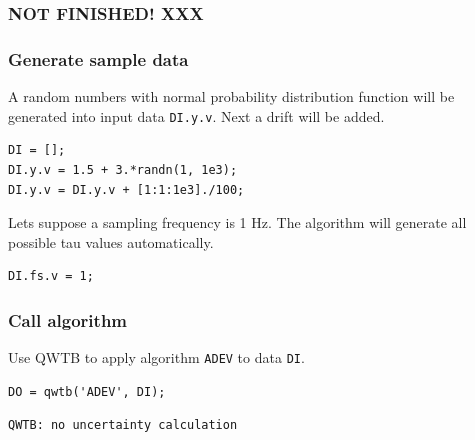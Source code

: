 \startcontents[localtoc]



{}
\subsubsection*{NOT FINISHED! XXX}



{}
\subsubsection*{Generate sample data}



A random numbers with normal probability distribution function will be generated into input data \texttt{DI.y.v}. Next a drift will be added.

\begin{lstlisting}
DI = [];
DI.y.v = 1.5 + 3.*randn(1, 1e3);
DI.y.v = DI.y.v + [1:1:1e3]./100;
\end{lstlisting}


Lets suppose a sampling frequency is 1 Hz. The algorithm will generate all possible tau values automatically.

\begin{lstlisting}
DI.fs.v = 1;
\end{lstlisting}


{}
\subsubsection*{Call algorithm}



Use QWTB to apply algorithm \texttt{ADEV} to data \texttt{DI}.

\begin{lstlisting}
DO = qwtb('ADEV', DI);
\end{lstlisting}
\begin{lstlisting}[language={},xleftmargin=5pt,frame=none]
QWTB: no uncertainty calculation

\end{lstlisting}


